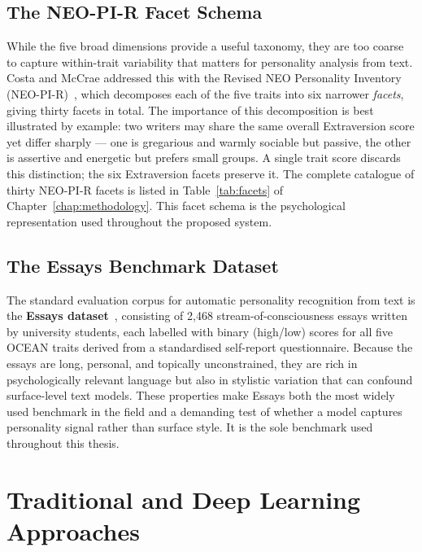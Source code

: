 \documentclass[../main.tex]{subfiles}
\begin{document}
\subsection{The NEO-PI-R Facet Schema}

While the five broad dimensions provide a useful taxonomy, they are too coarse to capture within-trait variability that matters for personality analysis from text. Costa and McCrae addressed this with the Revised NEO Personality Inventory (NEO-PI-R)~\cite{costa2008revised}, which decomposes each of the five traits into six narrower \emph{facets}, giving thirty facets in total. The importance of this decomposition is best illustrated by example: two writers may share the same overall Extraversion score yet differ sharply --- one is gregarious and warmly sociable but passive, the other is assertive and energetic but prefers small groups. A single trait score discards this distinction; the six Extraversion facets preserve it. The complete catalogue of thirty NEO-PI-R facets is listed in Table~\ref{tab:facets} of Chapter~\ref{chap:methodology}. This facet schema is the psychological representation used throughout the proposed system.

\subsection{The Essays Benchmark Dataset}

The standard evaluation corpus for automatic personality recognition from text is the \textbf{Essays dataset}~\cite{pennebaker1999linguistic}, consisting of 2,468 stream-of-consciousness essays written by university students, each labelled with binary (high/low) scores for all five OCEAN traits derived from a standardised self-report questionnaire. Because the essays are long, personal, and topically unconstrained, they are rich in psychologically relevant language but also in stylistic variation that can confound surface-level text models. These properties make Essays both the most widely used benchmark in the field and a demanding test of whether a model captures personality signal rather than surface style. It is the sole benchmark used throughout this thesis.

\section{Traditional and Deep Learning Approaches}
\label{sec:traditional}
\end{document}
